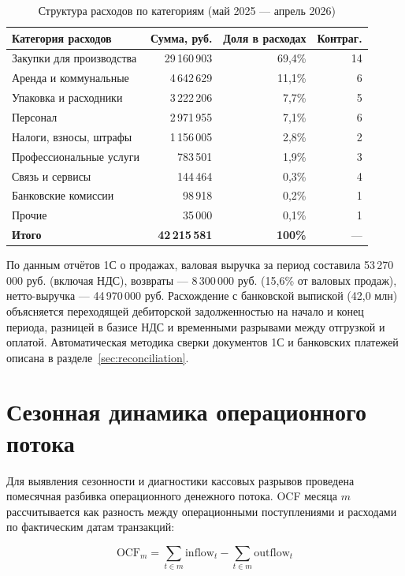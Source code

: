 \begin{table}[H]
\centering
\caption{Структура расходов по категориям (май 2025 --- апрель 2026)}
\label{tab:cost_structure}
\begin{tabular}{lrrr}
\toprule
\textbf{Категория расходов} & \textbf{Сумма, руб.} & \textbf{Доля в расходах} & \textbf{Контраг.} \\
\midrule
Закупки для производства & 29\,160\,903 & 69,4\% & 14 \\
Аренда и коммунальные & 4\,642\,629 & 11,1\% & 6 \\
Упаковка и расходники & 3\,222\,206 & 7,7\% & 5 \\
Персонал & 2\,971\,955 & 7,1\% & 6 \\
Налоги, взносы, штрафы & 1\,156\,005 & 2,8\% & 2 \\
Профессиональные услуги & 783\,501 & 1,9\% & 3 \\
Связь и сервисы & 144\,464 & 0,3\% & 4 \\
Банковские комиссии & 98\,918 & 0,2\% & 1 \\
Прочие & 35\,000 & 0,1\% & 1 \\
\midrule
\textbf{Итого} & \textbf{42\,215\,581} & \textbf{100\%} & --- \\
\bottomrule
\end{tabular}
\end{table}

По данным отчётов 1С о продажах, валовая выручка за период составила 53\,270\,000 руб. (включая НДС), возвраты --- 8\,300\,000 руб. (15,6\% от валовых продаж), нетто-выручка --- 44\,970\,000 руб. Расхождение с банковской выпиской (42,0 млн) объясняется переходящей дебиторской задолженностью на начало и конец периода, разницей в базисе НДС и временными разрывами между отгрузкой и оплатой. Автоматическая методика сверки документов 1С и банковских платежей описана в разделе~\ref{sec:reconciliation}.

\section{Сезонная динамика операционного потока}

Для выявления сезонности и диагностики кассовых разрывов проведена помесячная разбивка операционного денежного потока. OCF месяца $m$ рассчитывается как разность между операционными поступлениями и расходами по фактическим датам транзакций:

\begin{equation}
\text{OCF}_m = \sum_{t \in m} \text{inflow}_t - \sum_{t \in m} \text{outflow}_t
\end{equation}

